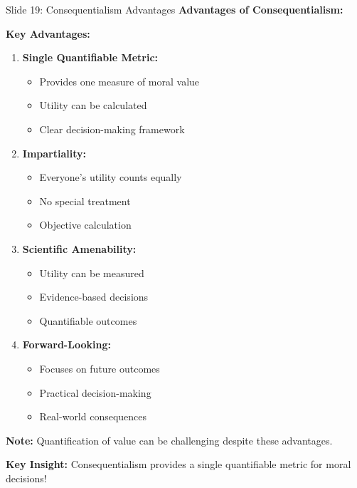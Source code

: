 \documentclass[8pt]{beamer}
\begin{document}
	\begin{frame}{Slide 19: Consequentialism Advantages}
		\fontsize{6.5}{7.5}\selectfont
		\textbf{Advantages of Consequentialism:}
		
		\vspace{0.1cm}
		\textbf{Key Advantages:}
		\begin{enumerate}
			\item \textbf{Single Quantifiable Metric:}
			\begin{itemize}
				\item Provides one measure of moral value
				\item Utility can be calculated
				\item Clear decision-making framework
			\end{itemize}
			\item \textbf{Impartiality:}
			\begin{itemize}
				\item Everyone's utility counts equally
				\item No special treatment
				\item Objective calculation
			\end{itemize}
			\item \textbf{Scientific Amenability:}
			\begin{itemize}
				\item Utility can be measured
				\item Evidence-based decisions
				\item Quantifiable outcomes
			\end{itemize}
			\item \textbf{Forward-Looking:}
			\begin{itemize}
				\item Focuses on future outcomes
				\item Practical decision-making
				\item Real-world consequences
			\end{itemize}
		\end{enumerate}
		
		\vspace{0.1cm}
		\textbf{Note:}
		Quantification of value can be challenging despite these advantages.
		
		\textcolor{myblue}{\textbf{Key Insight:}} Consequentialism provides \textcolor{myblue}{a single quantifiable metric} for moral decisions!
	\end{frame}
	
\end{document}
